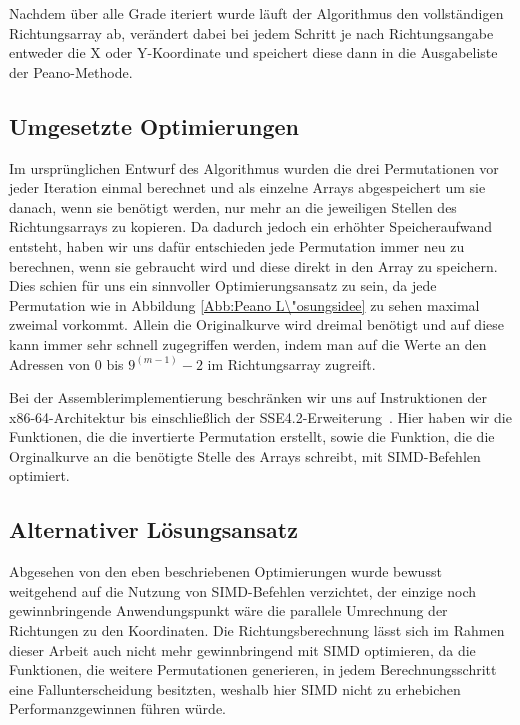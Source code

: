 \documentclass[course=asp]{aspdoc}
\begin{document}
Nachdem \"uber alle Grade iteriert wurde l\"auft der Algorithmus den vollst\"andigen Richtungsarray ab, ver\"andert dabei bei jedem Schritt je nach Richtungsangabe entweder die X oder Y-Koordinate und speichert diese dann in die Ausgabeliste der Peano-Methode.

\subsection{Umgesetzte Optimierungen} \label{Umgesetzte Optimierungen}

Im urspr\"unglichen Entwurf des Algorithmus wurden die drei Permutationen vor jeder Iteration einmal berechnet und als einzelne Arrays abgespeichert um sie danach, wenn sie ben\"otigt werden, nur mehr an die jeweiligen Stellen des Richtungsarrays zu kopieren. Da dadurch jedoch ein erh\"ohter Speicheraufwand entsteht, haben wir uns daf\"ur entschieden jede Permutation immer neu zu berechnen, wenn sie gebraucht wird und diese direkt in den Array zu speichern. Dies schien f\"ur uns ein sinnvoller Optimierungsansatz zu sein, da jede Permutation wie in Abbildung \ref{Abb:Peano L\"osungsidee} zu sehen maximal zweimal vorkommt. Allein die Originalkurve wird dreimal ben\"otigt und auf diese kann immer sehr schnell zugegriffen werden, indem man auf die Werte an den Adressen von $0$ bis $9^{(m - 1)} - 2$ im Richtungsarray zugreift. 

Bei der Assemblerimplementierung beschr\"anken wir uns auf Instruktionen der x86-64-Architektur bis einschlie\ss lich der SSE4.2-Erweiterung~\cite{intel2020man}. Hier haben wir die Funktionen, die die invertierte Permutation erstellt, sowie die Funktion, die die Orginalkurve an die ben\"otigte Stelle des Arrays schreibt, mit SIMD-Befehlen optimiert. 


\subsection{Alternativer L\"osungsansatz} \label{Alternativer L\"osungsansatz}

Abgesehen von den eben beschriebenen Optimierungen wurde bewusst weitgehend auf die Nutzung von SIMD-Befehlen verzichtet, der einzige noch gewinnbringende Anwendungspunkt w\"are die parallele Umrechnung der Richtungen zu den Koordinaten. Die Richtungsberechnung l\"asst sich im Rahmen dieser Arbeit auch nicht mehr gewinnbringend mit SIMD optimieren, da die Funktionen, die weitere Permutationen generieren, in jedem Berechnungsschritt eine Fallunterscheidung besitzten, weshalb hier SIMD nicht zu erhebichen Performanzgewinnen f\"uhren w\"urde. 
\end{document}
